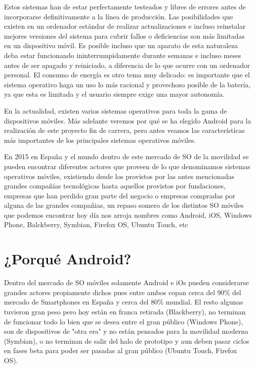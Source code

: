 \documentclass[../pfc.tex]{subfiles}
\begin{document}
	Estos sistemas han de estar perfectamente testeados y libres de errores antes de incorporarse definitivamente a la línea de producción. Las posibilidades que existen en un ordenador estándar de realizar actualizaciones e incluso reinstalar mejores versiones del sistema para cubrir fallos o deficiencias son más limitadas en un dispositivo móvil.
	Es posible incluso que un aparato de esta naturaleza deba estar funcionando ininterrumpidamente durante semanas e incluso meses antes de ser apagado y reiniciado, a diferencia de lo que ocurre con un ordenador personal. El consumo de energía es otro tema muy delicado: es importante que el sistema operativo haga un uso lo más racional y provechoso posible de la batería, ya que esta es limitada y el usuario siempre exige una mayor autonomía.
	
	En la actualidad, existen varios sistemas operativos para toda la gama de dispositivos móviles. Más adelante veremos por qué se ha elegido Android para la realización de este proyecto fin de carrera, pero antes veamos las características más importantes de los principales sistemas operativos móviles.
	
	En 2015 en España y el mundo dentro de este mercado de SO de la movilidad se pueden encontrar diferentes actores que proveen de lo que denominamos sistemas operativos móviles, existiendo desde los provistos por las antes mencionadas grandes compañías tecnológicas hasta aquellos provistos por fundaciones, empresas que han perdido gran parte del negocio o empresas compradas por alguna de las grandes compañias, un repaso somero de los distintos SO móviles que podemos encontrar hoy día nos arroja nombres como Android, iOS, Windows Phone, Balckberry, Symbian, Firefox OS, Ubuntu Touch, etc
		
	\section{¿Porqué Android?}
	Dentro del mercado de SO móviles solamente Android e iOs pueden considerarse grandes actores propiamente dichos pues entre ambos copan cerca del 90\% del mercado de Smartphones en España y cerca del 80\% mundial. El resto algunas tuvieron gran peso pero hoy están en franca retirada (Blackberry), no terminan de funcionar todo lo bien que se desea entre el gran público (Windows Phone), son de dispositivos de "otra era" y no están pensados para la movilidad moderna (Symbian), o no terminan de salir del halo de prototipo y aun deben pasar ciclos en fases beta para  poder ser pasadas al gran público (Ubuntu Touch, Firefox OS).
	
\end{document}
